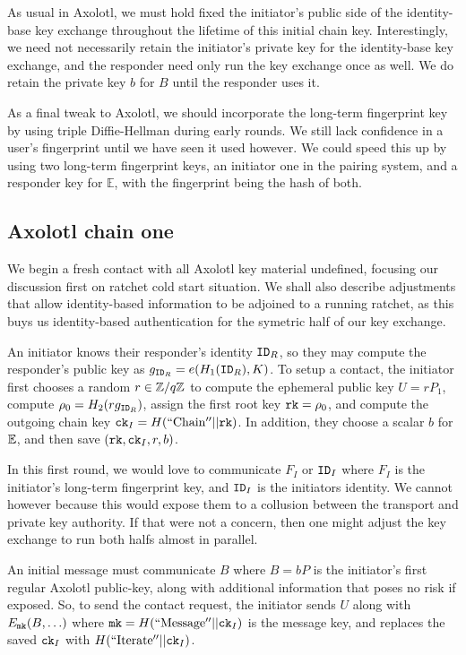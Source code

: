 \documentclass[twoside,letterpaper]{sig-alternate}
\begin{document}
As usual in Axolotl, we must hold fixed the initiator's public side of
the identity-base key exchange throughout the lifetime of this initial
chain key.  Interestingly, we need not necessarily retain the
initiator's private key for the identity-base key exchange, and
 the responder need only run the key exchange once as well.
We do retain the private key $b$ for $B$ until the responder uses it.

As a final tweak to Axolotl, we should incorporate the long-term
fingerprint key by using triple Diffie-Hellman during early rounds.
We still lack confidence in a user's fingerprint until
we have seen it used however.
We could speed this up by using two long-term fingerprint keys,
an initiator one in the pairing system, and
 a responder key for $\mathbb{E}$,
with the fingerprint being the hash of both.

\subsection{Axolotl chain one}

We begin a fresh contact with all Axolotl key material undefined, 
 focusing our discussion first on ratchet cold start situation.
We shall also describe adjustments that allow identity-based
information to be adjoined to a running ratchet,
as this buys us identity-based authentication for
 the symetric half of our key exchange.

\smallskip

An initiator knows their responder's identity $\mathtt{ID}_R$, so they may
compute the responder's public key as $g_{\mathtt{ID}_R} = e(H_1(\mathtt{ID}_R),K)$.
To setup a contact, the initiator first chooses a random $r \in \mathbb{Z}/q\mathbb{Z}$
to compute the ephemeral public key $U = r P_1$, 
 compute $\rho_0 = H_2(r g_{\mathtt{ID}_R})$,
 assign the first root key $\mathtt{rk} = \rho_0$, and 
 compute the outgoing chain key $\mathtt{ck}_I = H(\mathrm{``Chain''} || \mathtt{rk})$.
In addition, they choose a scalar $b$ for $\mathbb{E}$,
 and then save $(\mathtt{rk},\mathtt{ck}_I,r,b)$.

In this first round, we would love to communicate $F_I$ or $\mathtt{ID}_I$ where
 $F_I$ is the initiator's long-term fingerprint key, and
 $\mathtt{ID}_I$ is the initiators identity.
We cannot however because this would expose them to
 a collusion between the transport and private key authority.
If that were not a concern, then one might adjust the key exchange to
 run both halfs almost in parallel.

An initial message must communicate $B$ where
 $B = b P$ is the initiator's first regular Axolotl public-key,
along with additional information that poses no risk if exposed.
So, to send the contact request, the initiator
sends $U$ along with $E_{\mathtt{mk}}(B,\ldots)$ where
 $\mathtt{mk} = H(\mathrm{``Message''}  || \mathtt{ck}_I)$ is the message key,
and replaces the saved $\mathtt{ck}_I$ with $H(\mathrm{``Iterate''} || \mathtt{ck}_I)$.
\end{document}
